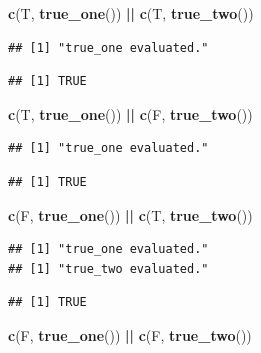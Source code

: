 \documentclass[]{book}
\newenvironment{Shaded}{\begin{snugshade}}{\end{snugshade}}
\newcommand{\KeywordTok}[1]{\textcolor[rgb]{0.13,0.29,0.53}{\textbf{#1}}}
\newcommand{\NormalTok}[1]{#1}
\newcommand{\OperatorTok}[1]{\textcolor[rgb]{0.81,0.36,0.00}{\textbf{#1}}}
\newcommand{\StringTok}[1]{\textcolor[rgb]{0.31,0.60,0.02}{#1}}
\begin{document}
\begin{Shaded}
\begin{Highlighting}[]
\KeywordTok{c}\NormalTok{(T, }\KeywordTok{true_one}\NormalTok{()) }\OperatorTok{||}\StringTok{ }\KeywordTok{c}\NormalTok{(T, }\KeywordTok{true_two}\NormalTok{())}
\end{Highlighting}
\end{Shaded}

\begin{verbatim}
## [1] "true_one evaluated."
\end{verbatim}

\begin{verbatim}
## [1] TRUE
\end{verbatim}

\begin{Shaded}
\begin{Highlighting}[]
\KeywordTok{c}\NormalTok{(T, }\KeywordTok{true_one}\NormalTok{()) }\OperatorTok{||}\StringTok{ }\KeywordTok{c}\NormalTok{(F, }\KeywordTok{true_two}\NormalTok{())}
\end{Highlighting}
\end{Shaded}

\begin{verbatim}
## [1] "true_one evaluated."
\end{verbatim}

\begin{verbatim}
## [1] TRUE
\end{verbatim}

\begin{Shaded}
\begin{Highlighting}[]
\KeywordTok{c}\NormalTok{(F, }\KeywordTok{true_one}\NormalTok{()) }\OperatorTok{||}\StringTok{ }\KeywordTok{c}\NormalTok{(T, }\KeywordTok{true_two}\NormalTok{()) }
\end{Highlighting}
\end{Shaded}

\begin{verbatim}
## [1] "true_one evaluated."
## [1] "true_two evaluated."
\end{verbatim}

\begin{verbatim}
## [1] TRUE
\end{verbatim}

\begin{Shaded}
\begin{Highlighting}[]
\KeywordTok{c}\NormalTok{(F, }\KeywordTok{true_one}\NormalTok{()) }\OperatorTok{||}\StringTok{ }\KeywordTok{c}\NormalTok{(F, }\KeywordTok{true_two}\NormalTok{()) }
\end{Highlighting}
\end{Shaded}
\end{document}
